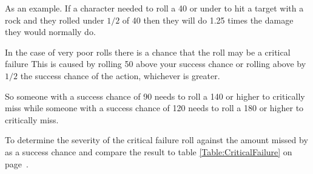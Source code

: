 As an example. If a character needed to roll a 40 or under to hit a target 
with a rock and they rolled under $ 1/2 $ of 40 then they will do 1.25
times the damage they would normally do.

In the case of very poor rolls there is a chance that the roll  
may be a critical failure This is caused by rolling 50 above your success chance or 
rolling above by $ 1/2 $ the success chance of the action, whichever is greater.

So someone with a success chance of 90 needs to roll a 140 or higher to
critically miss while someone with a success chance of 120 needs to roll a
180 or higher to critically miss.

To determine the severity of the critical failure roll against the 
amount missed by as a success chance and compare the result to table 
\ref{Table:CriticalFailure} on page~\pageref{Table:CriticalFailure}.



\clearpage
